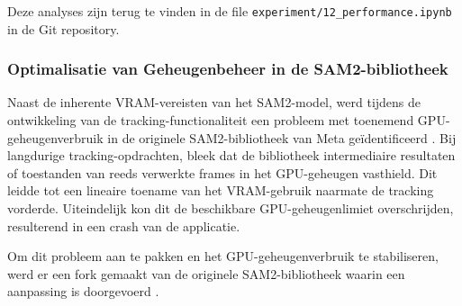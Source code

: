 Deze analyses zijn terug te vinden in de file \texttt{experiment/12\_performance.ipynb} in de Git repository.

\subsubsection{Optimalisatie van Geheugenbeheer in de SAM2-bibliotheek}

Naast de inherente VRAM-vereisten van het SAM2-model, werd tijdens de ontwikkeling van de tracking-functionaliteit een probleem met 
toenemend GPU-geheugenverbruik in de originele SAM2-bibliotheek van Meta geïdentificeerd \autocite{Hu2024facebookresearch}. 
Bij langdurige tracking-opdrachten, bleek dat de bibliotheek intermediaire 
resultaten of toestanden van reeds verwerkte frames in het GPU-geheugen vasthield. 
Dit leidde tot een lineaire toename van het VRAM-gebruik naarmate de tracking vorderde. 
Uiteindelijk kon dit de beschikbare GPU-geheugenlimiet overschrijden, resulterend in een crash van de applicatie. 

Om dit probleem aan te pakken en het GPU-geheugenverbruik te stabiliseren, werd er een fork gemaakt van de originele 
SAM2-bibliotheek waarin een aanpassing is doorgevoerd \autocite{Hu2025ilianbronchart}.

